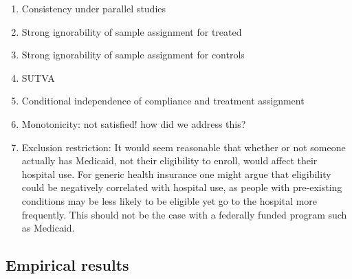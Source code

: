 \documentclass[12pt]{article}
\newcommand{\todo}[1]{{\color{red}{TO DO: \sc #1}}}
\begin{document}
\todo{Discuss how the assumptions for estimating PATT are met or not met by the data -- just brainstorming for now}
\begin{enumerate}
\item Consistency under parallel studies
\item Strong ignorability of sample assignment for treated
\item Strong ignorability of sample assignment for controls
\item SUTVA
\item Conditional independence of compliance and treatment assignment
\item Monotonicity: not satisfied! how did we address this?
\item Exclusion restriction: It would seem reasonable that whether or not someone actually has Medicaid, not their eligibility to enroll, would affect their hospital use.  For generic health insurance one might argue that eligibility could be negatively correlated with hospital use, as people with pre-existing conditions may be less likely to be eligible yet go to the hospital more frequently.  This should not be the case with a federally funded program such as Medicaid.
\end{enumerate}


\subsection{Empirical results}
\end{document}
